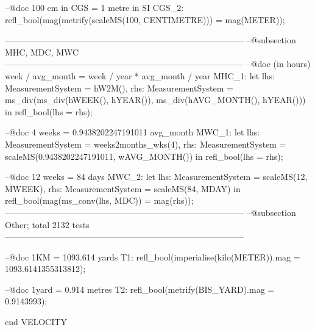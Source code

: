 \documentclass[a4paper]{article}
\begin{document}
\begin{vdm_al}
 --@doc 100 cm in CGS = 1 metre in SI
 CGS_2: refl_bool(mag(metrify(scaleMS(100, CENTIMETRE))) = mag(METER));

------------------------------------------------------------------------------------
--@subsection MHC, MDC, MWC
------------------------------------------------------------------------------------
 --@doc (in hours) week / avg_month = week / year * avg_month / year
 MHC_1: let
      lhs: MeasurementSystem = hW2M(),
      rhs: MeasurementSystem = ms_div(ms_div(hWEEK(), hYEAR()), ms_div(hAVG_MONTH(), hYEAR()))
     in
      refl_bool(lhs = rhs);

 --@doc 4 weeks = 0.9438202247191011 avg_month
 MWC_1: let
      lhs: MeasurementSystem = weeks2months_wks(4),
      rhs: MeasurementSystem = scaleMS(0.9438202247191011, wAVG_MONTH())
     in
      refl_bool(lhs = rhs);
 
 --@doc 12 weeks = 84 days
 MWC_2: let
      lhs: MeasurementSystem = scaleMS(12, MWEEK),
      rhs: MeasurementSystem = scaleMS(84, MDAY)
     in
      refl_bool(mag(ms_conv(lhs, MDC)) = mag(rhs));     
------------------------------------------------------------------------------------
--@subsection Other; total 2132 tests
------------------------------------------------------------------------------------

 --@doc 1KM = 1093.614 yards
 T1: refl_bool(imperialise(kilo(METER)).mag = 1093.6141355313812);

 --@doc 1yard = 0.914 metres
 T2: refl_bool(metrify(BIS_YARD).mag = 0.9143993);


end VELOCITY
\end{vdm_al}
\end{document}
